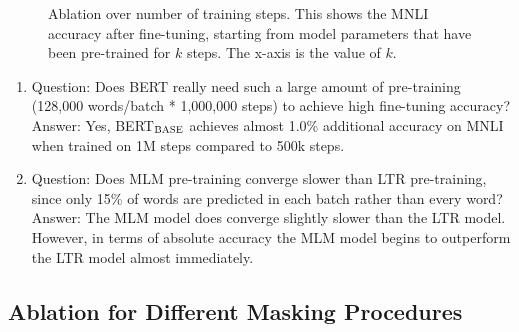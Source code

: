 \documentclass[11pt,a4paper]{article}
\newcommand\bertbase{BERT$_{\small \textsc{BASE}}$\xspace}
\begin{document}
\begin{figure}[b]
\caption{Ablation over number of training steps. This shows the MNLI accuracy after fine-tuning, starting from model parameters that have been pre-trained for $k$ steps. The x-axis is the value of $k$.}
\label{fig:step_abalation}
\end{figure}

\begin{enumerate}
\item Question: Does BERT really need such a large amount of pre-training (128,000 words/batch * 1,000,000 steps) to achieve high fine-tuning accuracy? \\
Answer: Yes, \bertbase achieves almost 1.0\% additional accuracy on MNLI when trained on 1M steps compared to 500k steps.
\item Question: Does MLM pre-training converge slower than LTR pre-training, since only 15\% of words are predicted in each batch rather than every word? \\
Answer: The MLM model does converge slightly slower than the LTR model. However, in terms of absolute accuracy the MLM model begins to outperform the LTR model almost immediately.
\end{enumerate}

\subsection{Ablation for Different Masking Procedures}
\label{appendix:sec:different_masks}
\end{document}
